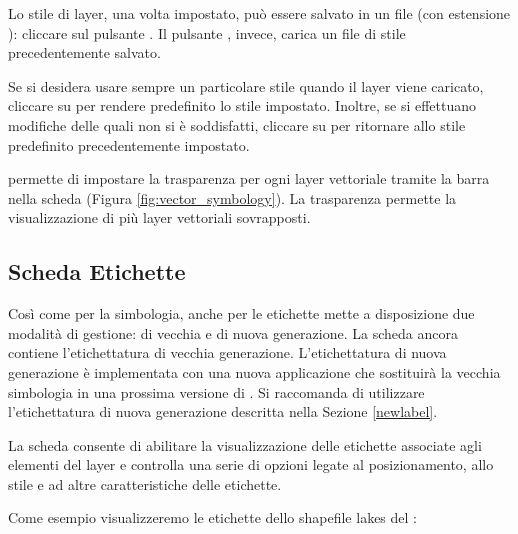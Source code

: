 Lo stile di layer, una volta impostato, può essere salvato in un file (con 
estensione ): cliccare sul pulsante . 
Il pulsante , invece, carica un file di stile 
precedentemente salvato.

Se si desidera usare sempre un particolare stile quando il layer viene
caricato, cliccare su  per rendere predefinito
lo stile impostato. Inoltre, se si effettuano modifiche delle quali
non si è soddisfatti, cliccare su  per
ritornare allo stile predefinito precedentemente impostato.

 \label{sec:vect_transparency} 
\qg permette di impostare la trasparenza per ogni layer vettoriale tramite la barra 
 nella scheda  (Figura \ref{fig:vector_symbology}).
La trasparenza permette la visualizzazione di più layer vettoriali sovrapposti.

\subsection{Scheda Etichette}\label{labeltab}

Così come per la simbologia, anche per le etichette  mette a disposizione
due modalità di gestione: di vecchia e di nuova generazione.
La scheda  ancora contiene l'etichettatura di vecchia generazione. 
L'etichettatura di nuova generazione è implementata con una nuova applicazione
che sostituirà la vecchia simbologia in una prossima versione di \qg.
Si raccomanda di utilizzare l'etichettatura di nuova generazione descritta nella 
Sezione \ref{newlabel}.

La scheda  consente di abilitare la visualizzazione delle
etichette associate agli elementi del layer e controlla una serie di
opzioni legate al posizionamento, allo stile e ad altre caratteristiche delle
etichette.

Come esempio visualizzeremo le etichette dello shapefile lakes del
:

